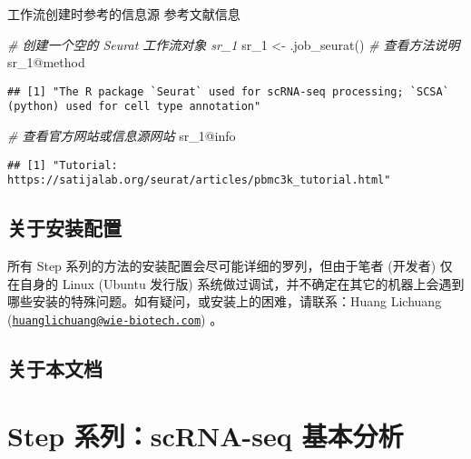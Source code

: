 \documentclass[
]{article}
\newenvironment{Shaded}{\begin{snugshade}}{\end{snugshade}}
\newcommand{\CommentTok}[1]{\textcolor[rgb]{0.56,0.35,0.01}{\textit{#1}}}
\newcommand{\FunctionTok}[1]{\textcolor[rgb]{0.00,0.00,0.00}{#1}}
\newcommand{\NormalTok}[1]{#1}
\newcommand{\OtherTok}[1]{\textcolor[rgb]{0.56,0.35,0.01}{#1}}
\newcommand{\SpecialCharTok}[1]{\textcolor[rgb]{0.00,0.00,0.00}{#1}}
\begin{document}
工作流创建时参考的信息源
参考文献信息

\begin{Shaded}
\begin{Highlighting}[]
\CommentTok{\# 创建一个空的 Seurat 工作流对象 \textquotesingle{}sr\_1\textquotesingle{}}
\NormalTok{sr\_1 }\OtherTok{\textless{}{-}} \FunctionTok{.job\_seurat}\NormalTok{()}
\CommentTok{\# 查看方法说明}
\NormalTok{sr\_1}\SpecialCharTok{@}\NormalTok{method}
\end{Highlighting}
\end{Shaded}

\begin{verbatim}
## [1] "The R package `Seurat` used for scRNA-seq processing; `SCSA` (python) used for cell type annotation"
\end{verbatim}

\begin{Shaded}
\begin{Highlighting}[]
\CommentTok{\# 查看官方网站或信息源网站}
\NormalTok{sr\_1}\SpecialCharTok{@}\NormalTok{info}
\end{Highlighting}
\end{Shaded}

\begin{verbatim}
## [1] "Tutorial: https://satijalab.org/seurat/articles/pbmc3k_tutorial.html"
\end{verbatim}

\hypertarget{ux5173ux4e8eux5b89ux88c5ux914dux7f6e}{%
\subsection{关于安装配置}\label{ux5173ux4e8eux5b89ux88c5ux914dux7f6e}}

所有 Step 系列的方法的安装配置会尽可能详细的罗列，但由于笔者 (开发者) 仅在自身的 Linux (Ubuntu 发行版) 系统做过调试，并不确定在其它的机器上会遇到哪些安装的特殊问题。如有疑问，或安装上的困难，请联系：Huang Lichuang (\href{mailto:huanglichuang@wie-biotech.com}{\nolinkurl{huanglichuang@wie-biotech.com}}) 。

\hypertarget{ux5173ux4e8eux672cux6587ux6863}{%
\subsection{关于本文档}\label{ux5173ux4e8eux672cux6587ux6863}}

\hypertarget{step-ux7cfbux5217scrna-seq-ux57faux672cux5206ux6790}{%
\section{Step 系列：scRNA-seq 基本分析}\label{step-ux7cfbux5217scrna-seq-ux57faux672cux5206ux6790}}
\end{document}
